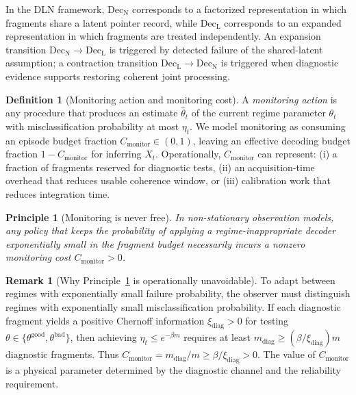 \documentclass[11pt]{article}
\newcommand{\1}{\mathbf{1}}
\theoremstyle{definition}
\newtheorem{definition}{Definition}
\newtheorem{remark}{Remark}
\theoremstyle{plain}
\newtheorem{principle}{Principle}
\begin{document}
In the DLN framework, $\mathrm{Dec}_{\mathrm{N}}$ corresponds to a factorized representation in which fragments share a latent pointer record, while $\mathrm{Dec}_{\mathrm{L}}$ corresponds to an expanded representation in which fragments are treated independently.
An expansion transition $\mathrm{Dec}_{\mathrm{N}}\to \mathrm{Dec}_{\mathrm{L}}$ is triggered by detected failure of the shared-latent assumption; a contraction transition $\mathrm{Dec}_{\mathrm{L}}\to \mathrm{Dec}_{\mathrm{N}}$ is triggered when diagnostic evidence supports restoring coherent joint processing.

\begin{definition}[Monitoring action and monitoring cost]
\label{def:monitoring-cost}
A \emph{monitoring action} is any procedure that produces an estimate $\widehat{\theta}_t$ of the current regime parameter $\theta_t$ with misclassification probability at most $\eta_t$.
We model monitoring as consuming an episode budget fraction $C_{\mathrm{monitor}}\in(0,1)$, leaving an effective decoding budget fraction $1-C_{\mathrm{monitor}}$ for inferring $X_t$.
Operationally, $C_{\mathrm{monitor}}$ can represent: (i) a fraction of fragments reserved for diagnostic tests, (ii) an acquisition-time overhead that reduces usable coherence window, or (iii) calibration work that reduces integration time.
\end{definition}

\begin{principle}[Monitoring is never free]
\label{prin:monitoring-positive}
In non-stationary observation models, any policy that keeps the probability of applying a regime-inappropriate decoder exponentially small in the fragment budget necessarily incurs a nonzero monitoring cost $C_{\mathrm{monitor}}>0$.
\end{principle}

\begin{remark}[Why Principle~\ref{prin:monitoring-positive} is operationally unavoidable]
To adapt between regimes with exponentially small failure probability, the observer must distinguish regimes with exponentially small misclassification probability.
If each diagnostic fragment yields a positive Chernoff information $\xi_{\mathrm{diag}}>0$ for testing $\theta\in\{\theta^{\mathrm{good}},\theta^{\mathrm{bad}}\}$, then achieving $\eta_t\le e^{-\beta m}$ requires at least $m_{\mathrm{diag}}\ge (\beta/\xi_{\mathrm{diag}})m$ diagnostic fragments.
Thus $C_{\mathrm{monitor}}=m_{\mathrm{diag}}/m\ge \beta/\xi_{\mathrm{diag}}>0$.
The value of $C_{\mathrm{monitor}}$ is a physical parameter determined by the diagnostic channel and the reliability requirement.
\end{remark}
\end{document}
